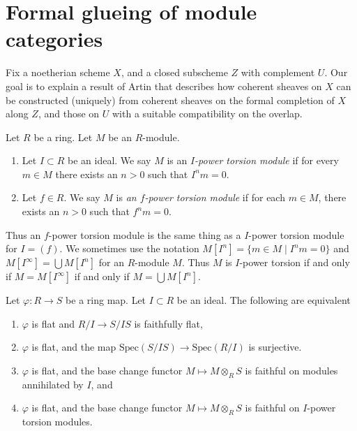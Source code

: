 \section{Formal glueing of module categories}
\label{section-formal-glueing}

\noindent
Fix a noetherian scheme $X$, and a closed subscheme $Z$ with complement $U$. 
Our goal is to explain a result of Artin that describes how coherent sheaves on 
$X$ can be constructed (uniquely) from coherent sheaves on the formal 
completion of $X$ along $Z$, and those on $U$ with a suitable compatibility on 
the overlap.

\begin{definition}
\label{definition-f-power-torsion}
Let $R$ be a ring. Let $M$ be an $R$-module.
\begin{enumerate}
\item Let $I \subset R$ be an ideal. We say $M$ is an
{\it $I$-power torsion module} if for every $m \in M$ there exists an $n > 0$
such that $I^n m = 0$.
\item Let $f \in R$. We say $M$ is 
{\it an $f$-power torsion module} if for each 
$m \in M$, there exists an $n > 0$ such that $f^n m = 0$.
\end{enumerate}
\end{definition}

\noindent
Thus an $f$-power torsion module is the same thing as a $I$-power torsion
module for $I = (f)$. We sometimes use the notation
$M[I^n] = \{m \in M \mid I^nm = 0\}$ and $M[I^\infty] = \bigcup M[I^n]$
for an $R$-module $M$. Thus $M$ is $I$-power torsion if and only if
$M = M[I^\infty]$ if and only if $M = \bigcup M[I^n]$.

\begin{lemma}
\label{lemma-characterize-flatness-on-torsion}
Let $\varphi : R \to S$ be a ring map. Let $I \subset R$ be an ideal.
The following are equivalent
\begin{enumerate}
\item $\varphi$ is flat and $R/I \to S/IS$ is faithfully flat,
\item $\varphi$ is flat, and the map
$\text{Spec}(S/IS) \to \text{Spec}(R/I)$ is surjective.
\item $\varphi$ is flat, and the base change functor
$M \mapsto M \otimes_R S$ is faithful on modules annihilated by $I$, and
\item $\varphi$ is flat, and the base change functor
$M \mapsto M \otimes_R S$ is faithful on $I$-power torsion modules.
\end{enumerate}
\end{lemma}

